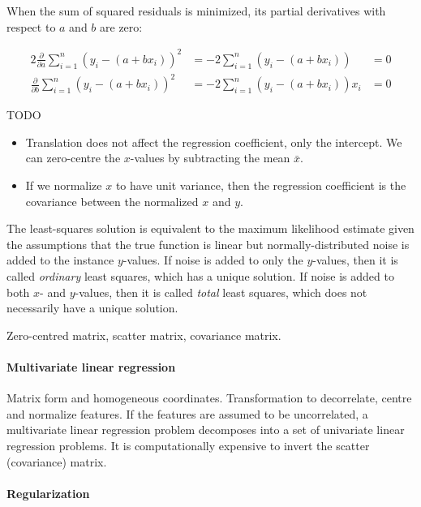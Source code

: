 When the sum of squared residuals is minimized, its partial derivatives with
respect to $a$ and $b$ are zero:

\begin{alignat}{2}
  \frac{\partial}{\partial a} \sum_{i = 1}^{n} (y_i - (a + b x_i))^2
   & = - 2 \sum_{i = 1}^{n} (y_i - (a + b x_i))
   & = 0
  \\
  \frac{\partial}{\partial b} \sum_{i = 1}^{n} (y_i - (a + b x_i))^2
   & = - 2 \sum_{i = 1}^{n} (y_i - (a + b x_i)) x_i
   & = 0
\end{alignat}

TODO

\begin{itemize}
  \item Translation does not affect the regression coefficient, only the intercept.
        We can zero-centre the $x$-values by subtracting the mean $\bar{x}$.
  \item If we normalize $x$ to have unit variance, then the regression
        coefficient is the covariance between the normalized $x$ and $y$.
\end{itemize}

The least-squares solution is equivalent to the maximum likelihood estimate
given the assumptions that the true function is linear but normally-distributed
noise is added to the instance $y$-values.
If noise is added to only the $y$-values, then it is called \textit{ordinary}
least squares, which has a unique solution.
If noise is added to both $x$- and $y$-values, then it is called \textit{total}
least squares, which does not necessarily have a unique solution.

Zero-centred matrix, scatter matrix, covariance matrix.

\paragraph{Multivariate linear regression}

Matrix form and homogeneous coordinates.
Transformation to decorrelate, centre and normalize features.
If the features are assumed to be uncorrelated, a multivariate linear
regression problem decomposes into a set of univariate linear regression
problems.
It is computationally expensive to invert the scatter (covariance) matrix.

\paragraph{Regularization}

